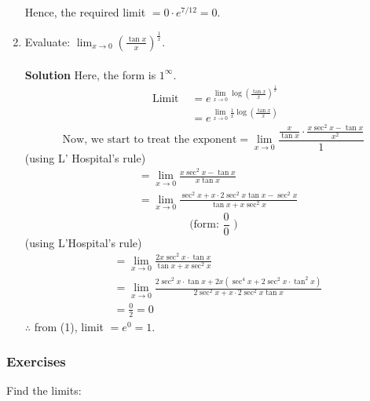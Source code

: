 \begin{enumerate}
Hence, the required limit $=0 \cdot e^{7 / 12}=0$.

\newpage
\item Evaluate: $\lim _{x \rightarrow 0}\left(\frac{\tan x}{x}\right)^{\frac{1}{x}}$.\\\\

\textbf{Solution}
Here, the form is $1^{\infty}$.
$$
\begin{aligned}
\text { Limit } & =e^{\lim _{x \rightarrow 0} \log \left(\frac{\tan x}{x}\right)^{\frac{1}{x}}} \\
& =e^{\lim _{x \rightarrow 0} \frac{1}{x} \log \left(\frac{\tan x}{x}\right)}
\end{aligned}
$$
$$ \text{Now, we start to treat the exponent}
=\lim _{x \rightarrow 0} \frac{\frac{x}{\tan x} \cdot \frac{x \sec ^2 x-\tan x}{x^2}}{1}
$$
(using L' Hospital's rule)
$$
\begin{aligned}
& =\lim _{x \rightarrow 0} \frac{x \sec ^2 x-\tan x}{x \tan x} \\
& =\lim _{x \rightarrow 0} \frac{\sec ^2 x+x \cdot 2 \sec ^2 x \tan x-\sec ^2 x}{\tan x+x \sec ^2 x}
\end{aligned}
$$
$$
\text { (form: } \frac{0}{0} \text { ) }
$$
(using L'Hospital's rule)
$$
\begin{aligned}
& =\lim _{x \rightarrow 0} \frac{2 x \sec ^2 x \cdot \tan x}{\tan x+x \sec ^2 x} \\
& =\lim _{x \rightarrow 0} \frac{2 \sec ^2 x \cdot \tan x+2 x\left(\sec ^4 x+2 \sec ^2 x \cdot \tan ^2 x\right)}{2 \sec ^2 x+x \cdot 2 \sec ^2 x \tan x} \\
& =\frac{0}{2}=0
\end{aligned}
$$
$\therefore$ from (1), limit $=e^0=1$.
\end{enumerate}


\subsubsection{Exercises}

Find the limits:

